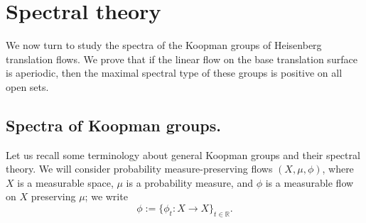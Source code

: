 \documentclass{amsart}
\theoremstyle{definition}
\theoremstyle{remark}
\numberwithin{equation}{section}
\newcommand{\<}{{\langle}}
\renewcommand{\>}{{\rangle}}
\newcommand{\field}[1]{\mathbb{#1}}
\newcommand{\R}{\field{R}}
\begin{document}

    



\section{Spectral theory}\label{sec:spectral}

We now turn to study the spectra of the Koopman groups of Heisenberg translation flows. We prove that if the linear flow on the base translation surface is aperiodic, then the maximal spectral type of these groups is positive on all open sets. 

\subsection{Spectra of Koopman groups.} Let us recall some terminology about general Koopman groups and their spectral theory. We will consider probability measure-preserving flows $(X,\mu,\phi)$, where $X$ is a measurable space, $\mu$ is a probability measure, and $\phi$ is a measurable flow on $X$ preserving $\mu$; we write
\[
\phi := \{\phi_t \colon X \to X\}_{t \in \mathbb{R}}.
\]
\end{document}
